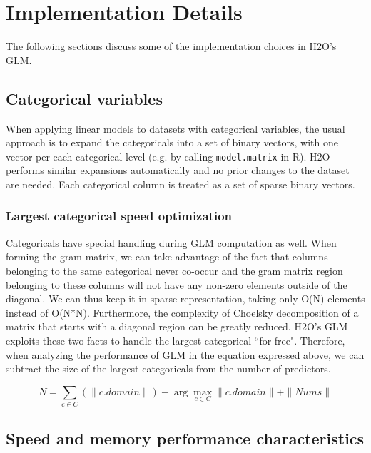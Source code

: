 
\section{Implementation Details}

The following sections discuss some of the implementation choices in H2O's GLM.

\subsection{Categorical variables}

When applying linear models to datasets with categorical variables, the usual approach is to expand the
categoricals into a set of binary vectors, with one vector per each categorical level (e.g. by calling
{\texttt{model.matrix}} in R). H2O performs similar expansions automatically and no prior changes to the dataset
are needed. Each categorical column is treated as a set of sparse binary vectors.

\subsubsection{Largest categorical speed optimization}

Categoricals have special handling during GLM computation as well. When forming the gram matrix, we can take
advantage of the fact that columns belonging to the same categorical never co-occur and the gram matrix region
belonging to these columns will not have any non-zero elements outside of the diagonal. We can thus keep it in
sparse representation, taking only O(N) elements instead of O(N*N). Furthermore, the complexity of Choelsky
decomposition of a matrix that starts with a diagonal region can be greatly reduced. H2O's GLM exploits these two
facts to handle the largest categorical ``for free". Therefore, when analyzing the performance of GLM in the
equation expressed above, we can subtract the size of the largest categoricals from the number of predictors.

$$N = \sum_{c \in C} (\|c.domain\|) - \arg\max_{c \in C} \|c.domain\| + \|Nums\| $$

\subsection{Speed and memory performance characteristics}


